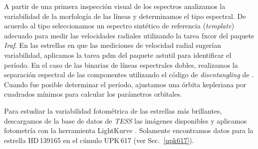\documentclass[baaa]{baaa}
\begin{document}
A partir de una primera inspección visual de los espectros analizamos la variabilidad de la morfología de las líneas y determinamos el tipo espectral. De acuerdo al tipo seleccionamos un espectro sintético de referencia ({\em template})  adecuado para medir las velocidades radiales utilizando la tarea {\sc fxcor} del paquete {\sl Iraf}. En las estrellas en que las mediciones de velocidad radial sugerían variabilidad, aplicamos la tarea {\sc pdm} del paquete {\sc astutil} para identificar el período. En el caso de las binarias de líneas espectrales dobles, realizamos la separación espectral de las componentes utilizando el código de {\em disentangling} de \citet{2006A&A...448..283G}. Cuando fue posible determinar el período, ajustamos una órbita kepleriana por cuadrados mínimos para calcular los parámetros orbitales.

Para estudiar la variabilidad fotométrica de las estrellas más brillantes, descargamos de la base de datos de {\sl TESS} las imágenes disponibles y aplicamos fotometría con la herramienta LightKurve \citep{2018ascl.soft12013L}. Solamente encontramos datos para la estrella HD\,139165 en el cúmulo UPK\,617 (ver Sec.~\ref{upk617}).
\end{document}
